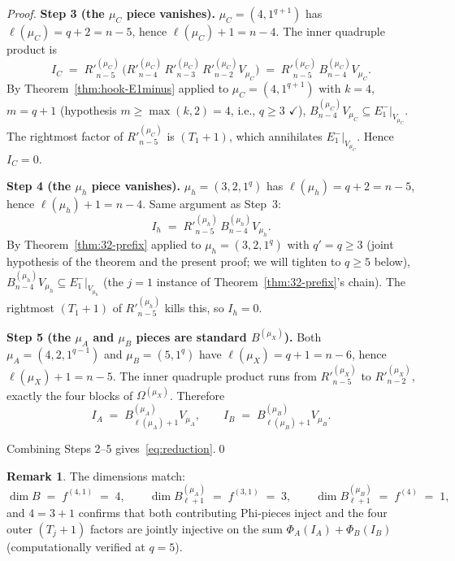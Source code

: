 \documentclass[11pt]{article}
\theoremstyle{definition}
\newtheorem{remark}[theorem]{Remark}
\newcommand{\Om}{\Omega}
\newcommand{\Rp}{{R'}}
\begin{document}
\begin{proof}
\medskip\textbf{Step 3 (the $\mu_C$ piece vanishes).}
$\mu_C = (4, 1^{q+1})$ has $\ell(\mu_C) = q + 2 = n - 5$, hence
$\ell(\mu_C) + 1 = n - 4$.  The inner quadruple product is
\[
   I_C \;=\; \Rp_{n-5}^{(\mu_C)}\,\bigl(\Rp_{n-4}^{(\mu_C)}\,
   \Rp_{n-3}^{(\mu_C)}\,\Rp_{n-2}^{(\mu_C)} V_{\mu_C}\bigr)
   \;=\; \Rp_{n-5}^{(\mu_C)}\,B^{(\mu_C)}_{n-4} V_{\mu_C}.
\]
By Theorem~\ref{thm:hook-E1minus} applied to $\mu_C = (4, 1^{q+1})$
with $k = 4$, $m = q + 1$ (hypothesis $m \ge \max(k, 2) = 4$, i.e.,
$q \ge 3$ $\checkmark$), $B^{(\mu_C)}_{n-4} V_{\mu_C} \subseteq
E_1^-|_{V_{\mu_C}}$.  The rightmost factor of $\Rp_{n-5}^{(\mu_C)}$ is
$(T_1+1)$, which annihilates $E_1^-|_{V_{\mu_C}}$.  Hence $I_C = 0$.

\medskip\textbf{Step 4 (the $\mu_h$ piece vanishes).}
$\mu_h = (3, 2, 1^q)$ has $\ell(\mu_h) = q + 2 = n - 5$, hence
$\ell(\mu_h) + 1 = n - 4$.  Same argument as Step~3:
\[
   I_h \;=\; \Rp_{n-5}^{(\mu_h)}\,B^{(\mu_h)}_{n-4} V_{\mu_h}.
\]
By Theorem~\ref{thm:32-prefix} applied to $\mu_h = (3, 2, 1^q)$ with
$q' = q \ge 3$ (joint hypothesis of the theorem and the present proof;
we will tighten to $q \ge 5$ below), $B^{(\mu_h)}_{n-4} V_{\mu_h}
\subseteq E_1^-|_{V_{\mu_h}}$ (the $j = 1$ instance of
Theorem~\ref{thm:32-prefix}'s chain).  The rightmost $(T_1+1)$ of
$\Rp_{n-5}^{(\mu_h)}$ kills this, so $I_h = 0$.

\medskip\textbf{Step 5 (the $\mu_A$ and $\mu_B$ pieces are standard
$B^{(\mu_X)}$).}  Both $\mu_A = (4, 2, 1^{q-1})$ and $\mu_B = (5, 1^q)$
have $\ell(\mu_X) = q + 1 = n - 6$, hence $\ell(\mu_X) + 1 = n - 5$.
The inner quadruple product runs from $\Rp^{(\mu_X)}_{n-5}$ to
$\Rp^{(\mu_X)}_{n-2}$, exactly the four blocks of $\Om^{(\mu_X)}$.
Therefore
\[
   I_A \;=\; B^{(\mu_A)}_{\ell(\mu_A)+1} V_{\mu_A},
   \qquad
   I_B \;=\; B^{(\mu_B)}_{\ell(\mu_B)+1} V_{\mu_B}.
\]

Combining Steps 2--5 gives~\eqref{eq:reduction}.\qed
\end{proof}

\begin{remark}\label{rem:dim-add}
The dimensions match:
\[
   \dim B \;=\; f^{(4, 1)} \;=\; 4,
   \qquad
   \dim B^{(\mu_A)}_{\ell+1} \;=\; f^{(3, 1)} \;=\; 3,
   \qquad
   \dim B^{(\mu_B)}_{\ell+1} \;=\; f^{(4)} \;=\; 1,
\]
and $4 = 3 + 1$ confirms that both contributing Phi-pieces inject and
the four outer $(T_j+1)$ factors are jointly injective on the sum
$\Phi_A(I_A) + \Phi_B(I_B)$ (computationally verified at $q = 5$).
\end{remark}
\end{document}
